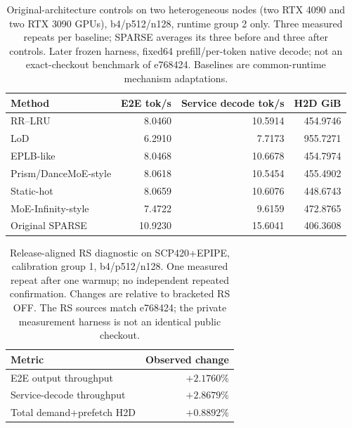 \begin{table}[t]
\centering
\caption{Original-architecture controls on two heterogeneous nodes (two RTX 4090 and two RTX 3090 GPUs), b4/p512/n128, runtime group 2 only. Three measured repeats per baseline; SPARSE averages its three before and three after controls. Later frozen harness, fixed64 prefill/per-token native decode; not an exact-checkout benchmark of e768424. Baselines are common-runtime mechanism adaptations.}
\label{tab:original-b4g2-evidence}
\begin{tabular}{lrrr}
\toprule
Method & E2E tok/s & Service decode tok/s & H2D GiB \\
\midrule
RR--LRU & 8.0460 & 10.5914 & 454.9746 \\
LoD & 6.2910 & 7.7173 & 955.7271 \\
EPLB-like & 8.0468 & 10.6678 & 454.7974 \\
Prism/DanceMoE-style & 8.0618 & 10.5454 & 455.4902 \\
Static-hot & 8.0659 & 10.6076 & 448.6743 \\
MoE-Infinity-style & 7.4722 & 9.6159 & 472.8765 \\
Original SPARSE & 10.9230 & 15.6041 & 406.3608 \\
\bottomrule
\end{tabular}
\end{table}

\begin{table}[t]
\centering
\caption{Release-aligned RS diagnostic on SCP420+EPIPE, calibration group 1, b4/p512/n128. One measured repeat after one warmup; no independent repeated confirmation. Changes are relative to bracketed RS OFF. The RS sources match e768424; the private measurement harness is not an identical public checkout.}
\label{tab:rs-calibration-evidence}
\begin{tabular}{lr}
\toprule
Metric & Observed change \\
\midrule
E2E output throughput & $+2.1760\%$ \\
Service-decode throughput & $+2.8679\%$ \\
Total demand+prefetch H2D & $+0.8892\%$ \\
\bottomrule
\end{tabular}
\end{table}
